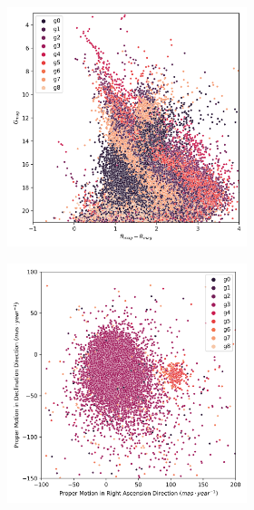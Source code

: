 \documentclass[11pt, a4paper, english]{book}
\begin{document}
\begin{figure}[H]
\begin{subfigure}{0.9\textwidth}
\begin{subfigure}[t]{0.30\textwidth}
    \end{subfigure}
    \hfill
    \begin{subfigure}[t]{0.30\textwidth}
      \centering
      \includegraphics[width=\textwidth]{../figures/melotte_25/kmeans_hr_diagram_melotte_25.png}
    \end{subfigure}
  \end{subfigure}
  \caption{Melotte 25 KMeans characterization. Identified as cluster \emph{g4}.}
  \label{fig:result_melotte_25_kmeans}
  \centering
  \begin{subfigure}{0.9\textwidth}
    \centering
    \begin{subfigure}[t]{0.30\textwidth}
      \centering
      \includegraphics[width=\textwidth]{../figures/melotte_25/dec_pm_melotte_25.png}

\end{subfigure}
\end{subfigure}
\end{figure}
\end{document}
